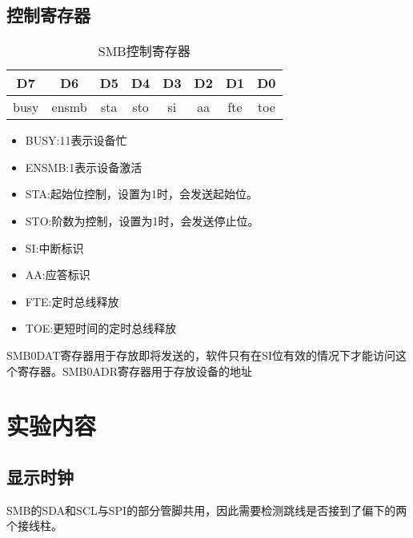\documentclass{article}
\newcommand{\ifc}{$I^2C$}
\begin{document}
\begin{CJK}{UTF8}{gkai}
\subsection{控制寄存器}
\begin{table}
  \caption{SMB控制寄存器}
  \label{pro1_2}
  \begin{tabular}{|c|c|c|c|c|c|c|c|}
    \hline
    D7&D6&D5&D4&D3&D2&D1&D0 \\
    \hline
    busy&ensmb&sta&sto&si&aa&fte&toe\\
    \hline
  \end{tabular}
\end{table}
\begin{itemize}
  \item BUSY:11表示设备忙
  \item ENSMB:1表示设备激活
  \item STA:起始位控制，设置为1时，会发送起始位。
  \item STO:阶数为控制，设置为1时，会发送停止位。
  \item SI:中断标识
  \item AA:应答标识
  \item FTE:定时总线释放
  \item TOE:更短时间的定时总线释放
\end{itemize}

SMB0DAT寄存器用于存放即将发送的，软件只有在SI位有效的情况下才能访问这个寄存器。SMB0ADR寄存器用于存放设备的地址
\section{实验内容}
\subsection{显示时钟}
SMB的SDA和SCL与SPI的部分管脚共用，因此需要检测跳线是否接到了偏下的两个接线柱。





\end{CJK}
\end{document}
